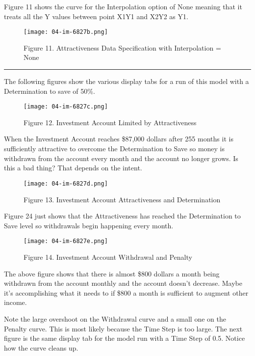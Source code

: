 \documentclass[]{memoir}
\let\Oldincludegraphics\includegraphics
\renewcommand{\includegraphics}[1]{\Oldincludegraphics[max size={\textwidth}{\textheight}]{#1}}
\begin{document}
Figure 11 shows the curve for the Interpolation option of None meaning
that it treats all the Y values between point X1Y1 and X2Y2 as Y1.

\begin{figure}[htbp]
\centering
\texttt{[image: 04-im-6827b.png]}
\caption{Figure 11. Attractiveness Data Specification with Interpolation
= None}
\end{figure}

\begin{center}\rule{3in}{0.4pt}\end{center}

The following figures show the various display tabs for a run of this
model with a Determination to save of 50\%.

\begin{figure}[htbp]
\centering
\texttt{[image: 04-im-6827c.png]}
\caption{Figure 12. Investment Account Limited by Attractiveness}
\end{figure}

When the Investment Account reaches \$87,000 dollars after 255 months it
is sufficiently attractive to overcome the Determination to Save so
money is withdrawn from the account every month and the account no
longer grows. Is this a bad thing? That depends on the intent.

\begin{figure}[htbp]
\centering
\texttt{[image: 04-im-6827d.png]}
\caption{Figure 13. Investment Account Attractiveness and Determination}
\end{figure}

Figure 24 just shows that the Attractiveness has reached the
Determination to Save level so withdrawals begin happening every month.

\begin{figure}[htbp]
\centering
\texttt{[image: 04-im-6827e.png]}
\caption{Figure 14. Investment Account Withdrawal and Penalty}
\end{figure}

The above figure shows that there is almost \$800 dollars a month being
withdrawn from the account monthly and the account doesn't decrease.
Maybe it's accomplishing what it needs to if \$800 a month is sufficient
to augment other income.

Note the large overshoot on the Withdrawal curve and a small one on the
Penalty curve. This is most likely because the Time Step is too large.
The next figure is the same display tab for the model run with a Time
Step of 0.5. Notice how the curve cleans up.
\end{document}
